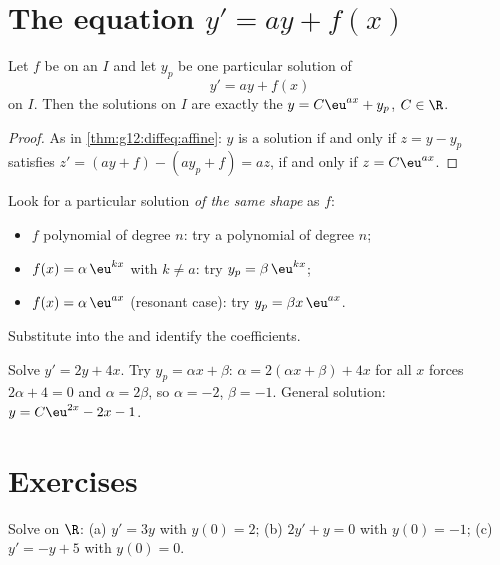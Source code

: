 \section{The equation \texorpdfstring{$y' = ay + f(x)$}{y' = ay + f(x)}}

\begin{proposition}\label{prop:g12:diffeq:general}
Let $f$ be  on an  $I$ and let $y_p$ be one particular
solution of
\[
y' = ay + f(x)
\]
on $I$. Then the solutions on $I$ are exactly the 
$y = C\eu^{ax} + y_p$, $C \in \R$.
\end{proposition}

\begin{proof}
As in \cref{thm:g12:diffeq:affine}: $y$ is a solution if and only if
$z = y - y_p$ satisfies
$z' = (ay + f) - (ay_p + f) = az$, if and only if $z = C\eu^{ax}$.
\end{proof}

\begin{method}\label{met:g12:diffeq:particular}
Look for a particular solution \emph{of the same shape} as $f$:
\begin{itemize}
  \item $f$ polynomial of degree $n$: try a polynomial of degree $n$;
  \item $f(x) = \alpha\,\eu^{kx}$ with $k \neq a$: try $y_p = \beta\,\eu^{kx}$;
  \item $f(x) = \alpha\,\eu^{ax}$ (resonant case): try
        $y_p = \beta x\,\eu^{ax}$.
\end{itemize}
Substitute into the  and identify the coefficients.
\end{method}

\begin{example}\label{ex:g12:diffeq:particular}
Solve $y' = 2y + 4x$. Try $y_p = \alpha x + \beta$:
$\alpha = 2(\alpha x + \beta) + 4x$ for all $x$ forces
$2\alpha + 4 = 0$ and $\alpha = 2\beta$, so $\alpha = -2$, $\beta = -1$.
General solution: $y = C\eu^{2x} - 2x - 1$.
\end{example}

\section{Exercises}

\begin{exercise}[$\star$]\label{exo:g12:diffeq:1}
Solve on $\R$:
(a) $y' = 3y$ with $y(0) = 2$;\quad
(b) $2y' + y = 0$ with $y(0) = -1$;\quad
(c) $y' = -y + 5$ with $y(0) = 0$.
\end{exercise}

